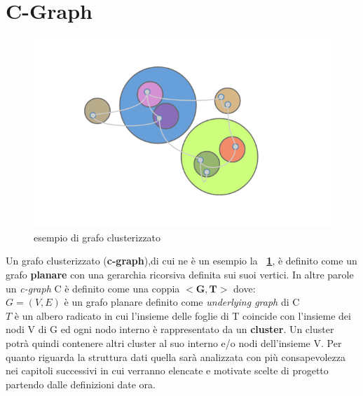 \section{C-Graph}
\begin{figure}[!htb]
	\begin{center}
		\includegraphics[width=0.9 \linewidth]{figure/cgraphGenerico}
	\end{center}
	\caption{esempio di grafo clusterizzato \label{fig:cgraphGenerico}}
\end{figure}
Un grafo clusterizzato (\textbf{c-graph}),di cui ne è un esempio la \textbf{\figurename~\ref{fig:cgraphGenerico}}, è definito come un grafo \textbf{planare} con una gerarchia ricorsiva definita sui suoi vertici. In altre parole un \textit{c-graph} C è definito come una coppia $<\textbf{G},\textbf{T}>$ dove: \\
$G=(V,E)$ è un grafo planare definito come \textit{underlying graph} di C\\
$T$ è un albero radicato in cui l'insieme delle foglie di T coincide con l'insieme dei nodi V di G ed ogni nodo interno è rappresentato da un \textbf{cluster}.
Un cluster potrà quindi contenere altri cluster al suo interno e/o nodi dell'insieme V.
Per quanto riguarda la struttura dati quella sarà analizzata con più consapevolezza nei capitoli successivi in cui verranno elencate e motivate scelte di progetto partendo dalle definizioni date ora.
